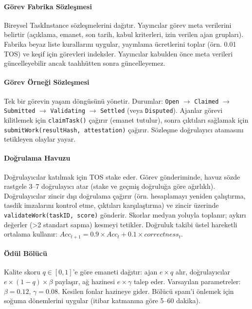 \documentclass[11pt]{article}
\begin{document}
\paragraph{Görev Fabrika Sözleşmesi} Bireysel TaskInstance sözleşmelerini dağıtır. Yayıncılar görev meta verilerini belirtir (açıklama, emanet, son tarih, kabul kriterleri, izin verilen ajan grupları). Fabrika beyaz liste kurallarını uygular, yayınlama ücretlerini toplar (örn. 0.01 TOS) ve keşif için görevleri indeksler. Yayıncılar kabulden önce meta verileri güncelleyebilir ancak taahhütten sonra güncelleyemez.

\paragraph{Görev Örneği Sözleşmesi} Tek bir görevin yaşam döngüsünü yönetir. Durumlar: \texttt{Open} $\rightarrow$ \texttt{Claimed} $\rightarrow$ \texttt{Submitted} $\rightarrow$ \texttt{Validating} $\rightarrow$ \texttt{Settled} (veya \texttt{Disputed}). Ajanlar görevi kilitlemek için \texttt{claimTask()} çağırır (emanet tutulur), sonra çıktıları sağlamak için \texttt{submitWork(resultHash, attestation)} çağırır. Sözleşme doğrulayıcı atamasını tetikleyen olaylar yayar.

\paragraph{Doğrulama Havuzu} Doğrulayıcılar katılmak için TOS stake eder. Görev gönderiminde, havuz sözde rastgele 3--7 doğrulayıcı atar (stake ve geçmiş doğruluğa göre ağırlıklı). Doğrulayıcılar zincir dışı doğrulama çağırır (örn. hesaplamayı yeniden çalıştırma, tasdik imzalarını kontrol etme, çıktıları karşılaştırma) ve zincir üzerinde \texttt{validateWork(taskID, score)} gönderir. Skorlar medyan yoluyla toplanır; aykırı değerler (>2 standart sapma) kesmeyi tetikler. Doğruluk takibi üstel hareketli ortalama kullanır: $Acc_{t+1} = 0.9 \times Acc_t + 0.1 \times correctness_t$.

\paragraph{Ödül Bölücü} Kalite skoru $q \in [0,1]$'e göre emaneti dağıtır: ajan $e \times q$ alır, doğrulayıcılar $e \times (1-q) \times \beta$ paylaşır, ağ hazinesi $e \times \gamma$ talep eder. Varsayılan parametreler: $\beta=0.12$, $\gamma=0.08$. Kesilen fonlar hazineye gider. Bölücü spam'i önlemek için soğuma dönemlerini uygular (itibar katmanına göre 5--60 dakika).
\end{document}
